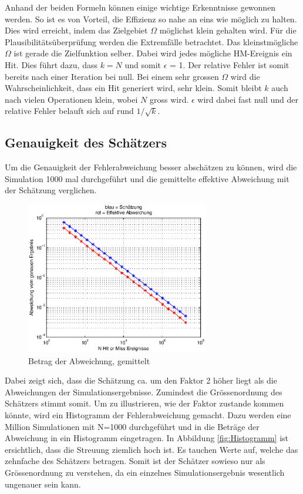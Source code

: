 \documentclass{book}
\begin{document}
\begin{refsection}
Anhand der beiden Formeln können einige wichtige Erkenntnisse gewonnen werden. So ist es von Vorteil, die Effizienz so nahe an eins wie möglich zu halten. Dies wird erreicht, indem das Zielgebiet $\Omega$ möglichst klein gehalten wird. Für die Plausibilitätsüberprüfung werden die Extremfälle betrachtet. Das kleinstmögliche $\Omega$ ist gerade die Zielfunktion selber. Dabei wird jedes mögliche HM-Ereignis ein Hit. Dies führt dazu, dass $k = N$ und somit $\epsilon$ = 1. Der relative Fehler ist somit bereits nach einer Iteration bei null. Bei einem sehr grossen $\Omega$ wird die Wahrscheinlichkeit, dass ein Hit generiert wird, sehr klein. Somit bleibt $k$ auch nach vielen Operationen klein, wobei $N$ gross wird. $\epsilon$ wird dabei fast null und der relative Fehler belauft sich auf rund $1/\sqrt{k}$.\\

\subsection{Genauigkeit des Schätzers}

Um die Genauigkeit der Fehlerabweichung besser abschätzen zu können, wird die Simulation 1000 mal durchgeführt und die gemittelte effektive Abweichung mit der Schätzung verglichen.\\

\begin{figure}[h]
    \centering
    \includegraphics[width=8cm]{images/Fehler_gemittelt.eps}
    \caption{Betrag der Abweichung, gemittelt}
    \label{fig:Fehler_gemittelt}
\end{figure}

Dabei zeigt sich, dass die Schätzung ca. um den Faktor 2 höher liegt als die Abweichungen der Simulationsergebnisse. Zumindest die Grössenordnung des Schätzers stimmt somit. Um zu illustrieren, wie der Faktor zustande kommen könnte, wird ein Histogramm der Fehlerabweichung gemacht. Dazu werden eine Million Simulationen mit N=1000 durchgeführt und in die Beträge der Abweichung in ein Histogramm eingetragen. In Abbildung \ref{fig:Histogramm} ist ersichtlich, dass die Streuung ziemlich hoch ist. Es tauchen Werte auf, welche das zehnfache des Schätzers betragen. Somit ist der Schätzer sowieso nur als Grössenordnung zu verstehen, da ein einzelnes Simulationsergebnis wesentlich ungenauer sein kann.


\end{refsection}
\end{document}

